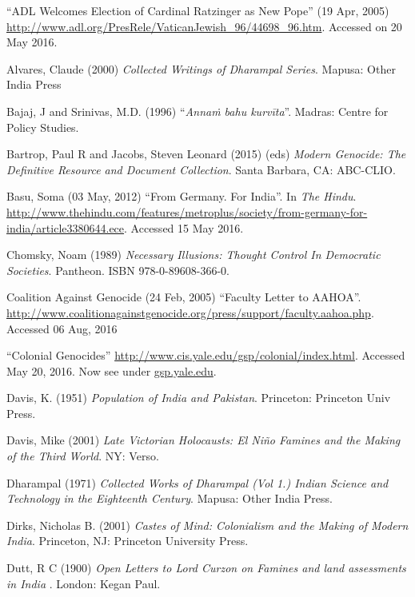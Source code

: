 \begin{thebibliography}{99}
\itemsep=2pt
“ADL Welcomes Election of Cardinal Ratzinger as New Pope” (19 Apr, 2005) \url{http://www.adl.org/PresRele/VaticanJewish_96/44698_96.htm}. Accessed on 20 May 2016. 

Alvares, Claude (2000) {\sl Collected Writings of Dharampal Series}. Mapusa: Other India Press

Bajaj, J and Srinivas, M.D. (1996) “{\sl Annaṁ bahu kurvīta}”. Madras: Centre for Policy Studies. 

Bartrop, Paul R and Jacobs, Steven Leonard (2015) (eds) {\sl Modern Genocide: The Definitive Resource and Document Collection}. Santa Barbara, CA: ABC-CLIO.

Basu, Soma (03 May, 2012) “From Germany. For India”. In {\sl The Hindu}. \url{http://www.thehindu.com/features/metroplus/society/from-germany-for-india/article3380644.ece}. Accessed 15 May 2016.

Chomsky, Noam (1989) {\sl Necessary Illusions: Thought Control In Democratic Societies}. Pantheon. ISBN 978-0-89608-366-0.

Coalition Against Genocide (24 Feb, 2005) “Faculty Letter to AAHOA”. 
\url{http://www.coalitionagainstgenocide.org/press/support/faculty.aahoa.php}. Accessed 06 Aug, 2016

“Colonial Genocides” \url{http://www.cis.yale.edu/gsp/colonial/index.html}. Accessed May 20, 2016. Now see under \url{gsp.yale.edu}.

Davis, K. (1951) {\sl Population of India and Pakistan}. Princeton: Princeton Univ Press.

Davis, Mike (2001) {\sl Late Victorian Holocausts: El Niño Famines and the Making of the Third World}. NY: Verso. 

Dharampal (1971) {\sl Collected Works of Dharampal (Vol 1.) Indian Science and Technology in the Eighteenth Century}. Mapusa: Other India Press.

Dirks, Nicholas B. (2001) {\sl Castes of Mind: Colonialism and the Making of Modern India}. Princeton, NJ: Princeton University Press.

Dutt, R C (1900) {\sl Open Letters to Lord Curzon on Famines and land assessments in India}	. London: Kegan Paul. 


\end{thebibliography}
